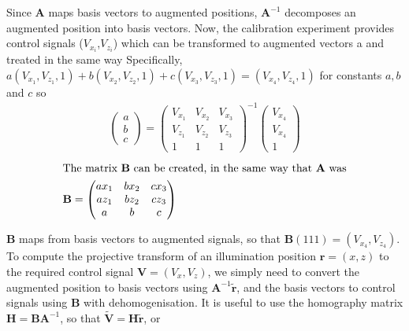 Since $\textbf{A}$ maps basis vectors to augmented positions, $\textbf{A}^{-1}$ decomposes an augmented position into basis vectors.
Now, the calibration experiment provides control signals ($V_{x_i}$,$V_{z_i}$) which can be transformed to augmented vectors a and treated in the same way
Specifically, ${a(V_{x_1},V_{z_1},1) + b(V_{x_2},V_{z_2},1)+c(V_{x_3},V_{z_3},1) = (V_{x_4},V_{z_4},1)}$ for constants $a,b$ and $c$ so
\begin{align}
  \begin{pmatrix}
  a  \\
  b \\
  c
  \end{pmatrix}
  =
  \begin{pmatrix}
  V_{x_1}& V_{x_2} & V_{x_3} \\
  V_{z_1} & V_{z_2} & V_{z_3} \\
  1 & 1 & 1
  \end{pmatrix}^{-1}
  \begin{pmatrix}
  V_{x_4}  \\
  V_{x_4} \\
  1
  \end{pmatrix}
\end{align}
\begin{align}
  \intertext{The matrix $\textbf{B}$ can be created, in the same way that \textbf{A} was}
\textbf{B} =
\begin{pmatrix}
a x_1 & b x_2 & c x_3 \\
a z_1 & b z_2 & c z_3 \\
a & b & c
\end{pmatrix}
\end{align}

\textbf{B} maps from basis vectors to augmented signals, so that $\textbf{B}(111)=\left( V_{x_4},V_{z_4} \right)$.
To compute the projective transform of an illumination position $\textbf{r}=(x,z)$ to the required control signal $\textbf{V} = (V_x,V_z)$, we simply need to convert the augmented position to basis vectors using ${\textbf{A}}^{-1}\widetilde{\textbf{r}}$, and the basis vectors to control signals using $\textbf{B}$ with dehomogenisation.
It is useful to use the homography matrix $\textbf{H} = \textbf{B}\textbf{A}^{-1}$, so that $\widetilde{\textbf{V}} = \textbf{H} \widetilde{\textbf{r}}$, or

